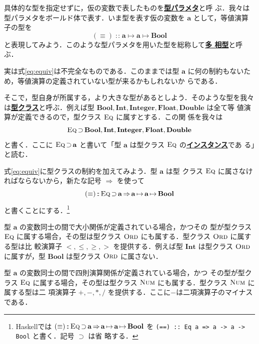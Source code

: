 \documentclass[a5paper,twoside,fleqn]{jsbook}
\newcommand{\programminglanguage}[1]{\textsf{#1}}
\newcommand{\haskell}{\programminglanguage{Haskell}}
\newcommand{\keyword}[1]{{\underline{\textbf{#1}}}}
\newcommand{\code}[1]{\texttt{#1}}
\DeclareMathOperator{\mSuperClass}{\Rightarrow}
\DeclareMathOperator{\mSuperSet}{\supset}
\DeclareMathOperator{\mIn}{{:\!:}}
\DeclareMathOperator{\mMapsTo}{\mapsto}
\newcommand{\mType}[1]{\mathbf{#1}}
\newcommand{\mBoolType}{\mType{Bool}}
\newcommand{\mFloatType}{\mType{Float}}
\newcommand{\mDoubleType}{\mType{Double}}
\newcommand{\mIntType}{\mType{Int}}
\newcommand{\mIntegerType}{\mType{Integer}}
\newcommand{\mGenericTypeClass}[1]{\textsc{#1}} %
\newcommand{\mEqTypeClass}{\mGenericTypeClass{Eq}}
\newcommand{\mNumTypeClass}{\mGenericTypeClass{Num}}
\newcommand{\mOrdTypeClass}{\mGenericTypeClass{Ord}}
\newcommand{\mProj}[2]{#1\mMapsTo#2}
\begin{document}
具体的な型を指定せずに，仮の変数で表したものを\keyword{型パラメタ}と呼
ぶ．我々は型パラメタをボールド体で表す．いま型を表す仮の変数を
$\mType{a}$ として，等値演算子の型を
\begin{equation}
\label{eq:equiv}
(\equiv)\mIn\mProj{\mProj{\mType{a}}{\mType{a}}}{\mBoolType}
\end{equation}
と表現してみよう．このような型パラメタを用いた型を総称して\keyword{多
  相型}と呼ぶ．

実は式\eqref{eq:equiv}は不完全なものである．このままでは型 $\mType{a}$
に何の制約もないため，等値演算の定義されていない型が来るかもしれないか
らである．

そこで，型自身が所属する，より大きな型があるとしよう．そのような型を我々
は\keyword{型クラス}と呼ぶ．例えば型
$\mBoolType,\mIntType,\mIntegerType,\mFloatType,\mDoubleType$ は全て等
値演算が定義できるので，型クラス $\mEqTypeClass$ に属すとする．この関
係を我々は
\begin{equation}
  \mEqTypeClass
  \mSuperSet\mBoolType,\mIntType,\mIntegerType,\mFloatType,\mDoubleType
\end{equation}
と書く．ここに $\mEqTypeClass\mSuperSet\mType{a}$ と書いて「型
  $\mType{a}$ は型クラス $\mEqTypeClass$ の\keyword{インスタンス}であ
  る」と読む．

式\eqref{eq:equiv}に型クラスの制約を加えてみよう．型 $\mType{a}$ は型
クラス $\mEqTypeClass$ に属さなければならないから，新たな記号
$\mSuperClass$ を使って
\begin{equation}
(\equiv) \mIn{}\mEqTypeClass\mSuperSet\mType{a}
  \mSuperClass\mProj{\mProj{\mType{a}}{\mType{a}}}{\mBoolType}
\end{equation}
と書くことにする．\footnote{\haskell では
  $(\equiv)\mIn{}\mEqTypeClass\mSuperSet\mType{a}
  \mSuperClass\mProj{\mProj{\mType{a}}{\mType{a}}}{\mBoolType}$ を
  \code{(==) :: Eq a => a -> a -> Bool} と書く．記号 $\mSuperSet$ は省
  略する．}

型 $\mType{a}$ の変数同士の間で大小関係が定義されている場合，かつその
型が型クラス $\mEqTypeClass$ に属する場合，その型は型クラス
$\mOrdTypeClass$ にも属する．型クラス $\mOrdTypeClass$ に属する型は比
較演算子 $<,\le,\ge,>$ を提供する．例えば型 $\mIntType$ は型クラス
$\mOrdTypeClass$ に属すが，型 $\mBoolType$ は型クラス $\mOrdTypeClass$
に属さない．

型 $\mType{a}$ の変数同士の間で四則演算関係が定義されている場合，かつ
その型が型クラス $\mEqTypeClass$ に属する場合，その型は型クラス
$\mNumTypeClass$ にも属する．型クラス $\mNumTypeClass$ に属する型は二
項演算子 $+,-,*,/$ を提供する．ここに$-$は二項演算子のマイナスである．
\end{document}
